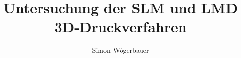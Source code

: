 \documentclass[12pt]{article}
\title{Untersuchung der SLM und LMD 3D-Druckverfahren}
\author{Simon Wögerbauer}
\begin{document}

\cite{key}
\blindtext[12]
{}

\end{document}
